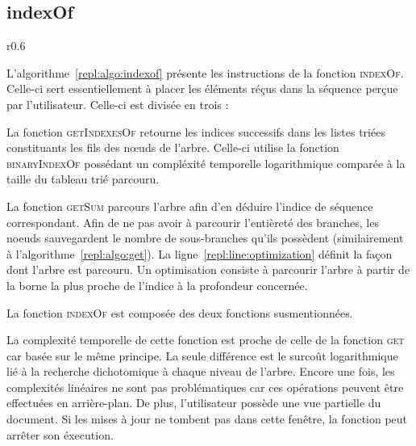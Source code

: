 \clearpage 

\subsection{indexOf}
\label{repl:subsec:indexof}

\begin{wrapfigure}{r}{0.6\textwidth}
  \vspace{-35pt} %
  \begin{minipage}[t]{0.6\textwidth}
    \begin{algorithm}[H]
      
      \caption{\label{repl:algo:indexof} indexOf.}
    \end{algorithm}
  \end{minipage}
  \vspace{-15pt}
\end{wrapfigure}

L'algorithme~\ref{repl:algo:indexof} présente les instructions de la fonction
\textsc{indexOf}. Celle-ci sert essentiellement à placer les éléments réçus dans
la séquence perçue par l'utilisateur.  Celle-ci est divisée en trois :
\begin{inparaenum}[(i)]
\item La fonction \textsc{getIndexesOf} retourne les indices successifs dans les
  listes triées constituants les fils des nœuds de l'arbre. Celle-ci utilise la
  fonction \textsc{binaryIndexOf} possédant un compléxité temporelle
  logarithmique comparée à la taille du tableau trié parcouru.
\item La fonction \textsc{getSum} parcours l'arbre afin d'en déduire l'indice de
  séquence correspondant. Afin de ne pas avoir à parcourir l'entièreté des
  branches, les noeuds sauvegardent le nombre de sous-branches qu'ils possèdent
  (similairement à l'algorithme~\ref{repl:algo:get}).  La
  ligne~\ref{repl:line:optimization} définit la façon dont l'arbre est
  parcouru. Un optimisation consiste à parcourir l'arbre à partir de la borne la
  plus proche de l'indice à la profondeur concernée.
\item La fonction \textsc{indexOf} est composée des deux fonctions
  susmentionnées.
\end{inparaenum}


La complexité temporelle de cette fonction est proche de celle de la fonction
\textsc{get} car basée sur le même principe. La seule différence est le surcoût
logarithmique lié à la recherche dichotomique à chaque niveau de l'arbre. Encore
une fois, les complexités linéaires ne sont pas problématiques car ces
opérations peuvent être effectuées en arrière-plan. De plus, l'utilisateur
possède une vue partielle du document. Si les mises à jour ne tombent pas dans
cette fenêtre, la fonction peut arrêter son éxecution.



